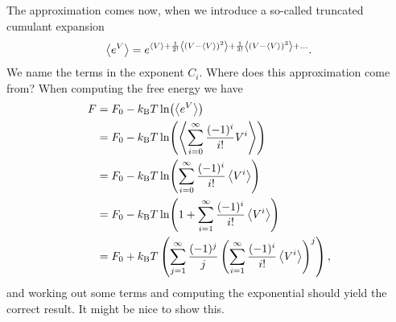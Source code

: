 The approximation comes now, when we introduce a so-called truncated cumulant expansion
\begin{align*}
	\expval{e^{V}} = e^{\expval{V} + \frac{1}{2!}\expval{(V - \expval{V})^{2}} + \frac{1}{3!}\expval{(V - \expval{V})^{3}} + \dots}.
\end{align*}
We name the terms in the exponent $C_{i}$. Where does this approximation come from? When computing the free energy we have
\begin{align*}
	F &= F_{0} - k_{\text{B}} T\ln(\expval{e^{V}}) \\
	  &= F_{0} - k_{\text{B}} T\ln(\expval{\sum\limits_{i = 0}^{\infty}\frac{(-1)^{i}}{i!}V^{i}}) \\
	  &= F_{0} - k_{\text{B}} T\ln(\sum\limits_{i = 0}^{\infty}\frac{(-1)^{i}}{i!}\expval{V^{i}}) \\
	  &= F_{0} - k_{\text{B}} T\ln(1 + \sum\limits_{i = 1}^{\infty}\frac{(-1)^{i}}{i!}\expval{V^{i}}) \\
	  &= F_{0} + k_{\text{B}} T\left(\sum\limits_{j = 1}^{\infty}\frac{(-1)^{j}}{j}\left(\sum\limits_{i = 1}^{\infty}\frac{(-1)^{i}}{i!}\expval{V^{i}}\right)^{j}\right),
\end{align*}
and working out some terms and computing the exponential should yield the correct result. It might be nice to show this.

